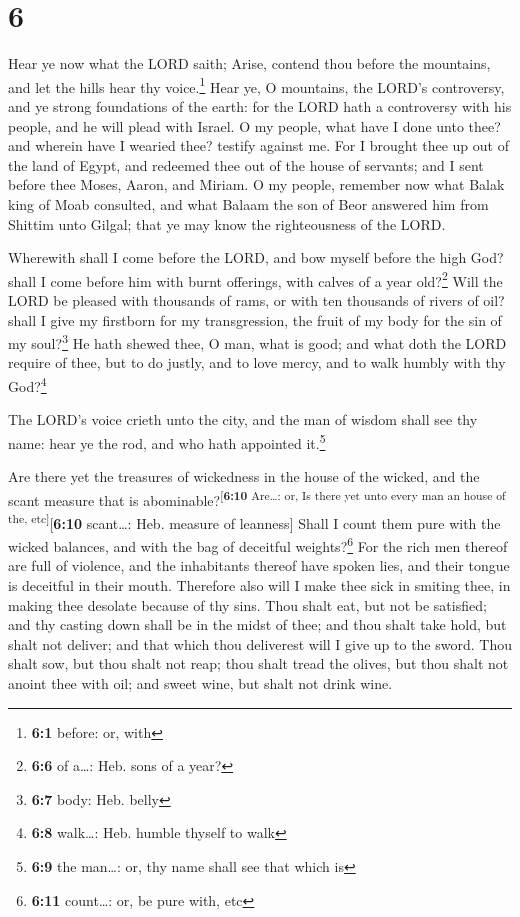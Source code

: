 \hypertarget{section-5}{%
\section{6}\label{section-5}}

 Hear ye now what the LORD saith; Arise, contend thou
before the mountains, and let the hills hear thy voice.\footnote{\textbf{6:1}
  before: or, with}  Hear ye, O mountains, the LORD's
controversy, and ye strong foundations of the earth: for the LORD hath a
controversy with his people, and he will plead with Israel.
 O my people, what have I done unto thee? and wherein have
I wearied thee? testify against me.  For I brought thee up
out of the land of Egypt, and redeemed thee out of the house of
servants; and I sent before thee Moses, Aaron, and Miriam.
 O my people, remember now what Balak king of Moab
consulted, and what Balaam the son of Beor answered him from Shittim
unto Gilgal; that ye may know the righteousness of the LORD.

 Wherewith shall I come before the LORD, and bow myself
before the high God? shall I come before him with burnt offerings, with
calves of a year old?\footnote{\textbf{6:6} of a\ldots: Heb. sons of a
  year?}  Will the LORD be pleased with thousands of rams,
or with ten thousands of rivers of oil? shall I give my firstborn for my
transgression, the fruit of my body for the sin of my soul?\footnote{\textbf{6:7}
  body: Heb. belly}  He hath shewed thee, O man, what is
good; and what doth the LORD require of thee, but to do justly, and to
love mercy, and to walk humbly with thy God?\footnote{\textbf{6:8}
  walk\ldots: Heb. humble thyself to walk}

 The LORD's voice crieth unto the city, and the man of
wisdom shall see thy name: hear ye the rod, and who hath appointed
it.\footnote{\textbf{6:9} the man\ldots: or, thy name shall see that
  which is}

 Are there yet the treasures of wickedness in the house
of the wicked, and the scant measure that is
abominable?\textsuperscript{{[}\textbf{6:10} Are\ldots: or, Is there yet
unto every man an house of the, etc{]}}{[}\textbf{6:10} scant\ldots:
Heb. measure of leanness{]}  Shall I count them pure with
the wicked balances, and with the bag of deceitful weights?\footnote{\textbf{6:11}
  count\ldots: or, be pure with, etc}  For the rich men
thereof are full of violence, and the inhabitants thereof have spoken
lies, and their tongue is deceitful in their mouth. 
Therefore also will I make thee sick in smiting thee, in making thee
desolate because of thy sins.  Thou shalt eat, but not be
satisfied; and thy casting down shall be in the midst of thee; and thou
shalt take hold, but shalt not deliver; and that which thou deliverest
will I give up to the sword.  Thou shalt sow, but thou
shalt not reap; thou shalt tread the olives, but thou shalt not anoint
thee with oil; and sweet wine, but shalt not drink wine.

